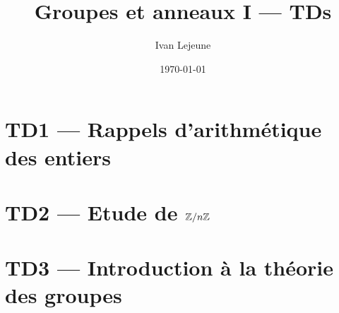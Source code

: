 \documentclass[french,a4paper,10pt]{article}
\title{\color{astral} \sffamily \bfseries Groupes et anneaux I --- TDs}
\author{Ivan Lejeune}
\date{\today}
\begin{document}
    \maketitle
    \tableofcontents

    \section*{TD1 --- Rappels d'arithmétique des entiers}\label{sec:TD1}
    \setcounter{section}{1}
    \setcounter{tdcounter}{0}
    
    \newpage

    \section*{TD2 --- Etude de \(\mathbb{Z}/n\mathbb{Z}\)}\label{sec:TD2}
    \setcounter{section}{2}
    \setcounter{tdcounter}{0}
    
    \newpage

    \section*{TD3 --- Introduction à la théorie des groupes}\label{sec:TD3}
    \setcounter{section}{3}
    \setcounter{tdcounter}{0}
    
    \newpage
\end{document}
